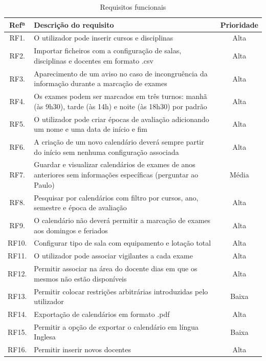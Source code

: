 \documentclass[11pt, twoside]{report}
\begin{document}
\begin{table}[H]
	\caption{Requisitos funcionais}
	\begin{center}	
		\begin{tabularx}{\textwidth}{|c|X|c|}
			\hline
			\textbf{Refª }	& \textbf{Descrição do requisito} & \textbf{Prioridade} \\
			\hline
			RF1. & O utilizador pode inserir cursos e disciplinas & Alta\\
			\hline
			RF2. & Importar ficheiros com a configuração de salas, disciplinas e docentes em formato .csv & Alta \\
			\hline
			RF3. & Aparecimento de um aviso no caso de incongruência da informação durante a marcação de exames & Alta \\
			\hline
			RF4. & Os exames podem ser marcados em três turnos: manhã (às 9h30), tarde (às 14h) e noite (às 18h30) por padrão & Alta \\
			\hline
			RF5. & O utilizador pode criar épocas de avaliação adicionando um nome e uma data de início e fim & Alta \\
			\hline
			RF6. & A criação de um novo calendário deverá sempre partir do início sem nenhuma configuração associada & Alta\\
			\hline
			RF7. & Guardar e visualizar calendários de exames de anos anteriores sem informações específicas (perguntar ao Paulo) & Média \\
			\hline
			RF8.  & Pesquisar por calendários com filtro por cursos, ano, semestre e época de avaliação  & Alta \\
			\hline
			RF9. & O calendário não deverá permitir a marcação de exames aos domingos e feriados & Alta \\
			\hline
			RF10. & Configurar tipo de sala com equipamento e lotação total & Alta \\
			\hline
			RF11. & O utilizador pode associar vigilantes a cada exame & Alta \\
			\hline
			RF12. & Permitir associar na área do docente dias em que os mesmos não estão disponíveis & Alta\\
			\hline
			RF13. & Permitir colocar restrições arbitrárias introduzidas pelo utilizador & Baixa \\
			\hline
			RF14. & Exportação de calendários em formato .pdf & Alta \\
			\hline
			RF15. & Permitir a opção de exportar o calendário em língua Inglesa & Baixa \\
			\hline
			RF16. & Permitir inserir novos docentes & Alta\\

\end{tabularx}
\end{center}
\end{table}
\end{document}
